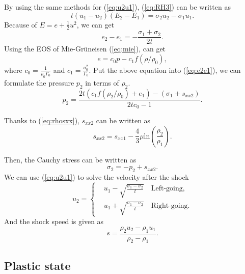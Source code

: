 \documentclass[review]{elsarticle}
\numberwithin{equation}{section}
\numberwithin{table}{section}
\begin{document}
By using the same methods for (\ref{eq:u2u1}), (\ref{eq:RH3}) can be written as
\begin{equation}
  t(u_1-u_2)(E_2-E_1) =\sigma_2 u_2-\sigma_1u_1.
\end{equation}
Because of $E= e+\frac{1}{2}u^2$, we can get
\begin{equation}\label{eq:e2e1}
  e_2 - e_1 = - \frac{\sigma_1 +\sigma_2}{2t}.
\end{equation}
Using the EOS of Mie-Gr\"uneisen (\ref{eq:mie}), can get
\begin{equation}
  e = c_0p -c_1f(\rho/\rho_0),
\end{equation}
where $c_0 = \frac{1}{\rho_0\Gamma_0}$ and $c_1 = \frac{a_0^2}{\Gamma_0}$.
Put the above equation into (\ref{eq:e2e1}), we can formulate the pressure $p_2$ in terms of $\rho_2$.
\begin{equation}\label{eq:shocke}
  p_2= \frac{2t(c_1f(\rho_2/\rho_0)+e_1)-(\sigma_1+s_{xx2})}{2tc_0-1}.
\end{equation}

Thanks to (\ref{eq:rhosxx}), $s_{xx2}$ can be written as
\begin{equation}
 s_{xx2} = s_{xx1}-\frac{4}{3}\mu\text{ln}(\frac{\rho_{2}}{\rho_{1}}).
\end{equation}

Then, the Cauchy stress can be written as
\begin{equation}
  \sigma_2 = -p_2 +s_{xx2}.
\end{equation}
We can use (\ref{eq:u2u1}) to solve the velocity after the shock
\begin{equation}\label{eq:shocku}
  u_2 = \left\{ \begin{aligned}
	 & u_1 - \sqrt{\frac{\sigma_1- \sigma_2}{t}} \quad \text{Left-going}, \\
	 & u_1 + \sqrt{\frac{\sigma_1- \sigma_2}{t}} \quad \text{Right-going}.
	\end{aligned}
	\right.
  \end{equation}
And the shock speed is given as
\begin{equation}
  s = \frac{\rho_2u_2-\rho_1u_1}{\rho_2-\rho_1}.
\end{equation}


\subsection{Plastic state}
\end{document}
